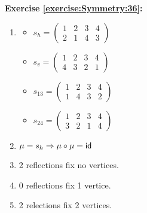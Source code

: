 \noindent\textbf{Exercise \ref{exercise:Symmetry:36}:}
\begin{enumerate}[{a.}]
\item
	\begin{multicols}{2}
	\begin{itemize}
	\item
	$s_h =\begin{pmatrix}
	1 & 2 & 3 & 4\\
	2 & 1 & 4 & 3
	\end{pmatrix}$
	
	\item
	$s_v =\begin{pmatrix}
	1 & 2 & 3 & 4\\
	4 & 3 & 2 & 1
	\end{pmatrix}$
	
	\item
	$s_{13} =\begin{pmatrix}
	1 & 2 & 3 & 4\\
	1 & 4 & 3 & 2
	\end{pmatrix}$
	
	\item
	$s_{24} =\begin{pmatrix}
	1 & 2 & 3 & 4\\
	3 & 2 & 1 & 4
	\end{pmatrix}$
	\end{itemize}
	\end{multicols}
	
\item
$\mu = s_h \Rightarrow \mu \circ \mu = \sf{id}$

\item
2 reflections fix no vertices.

\item
0 reflections fix 1 vertice.

\item
2 relections fix 2 vertices.
\end{enumerate}

